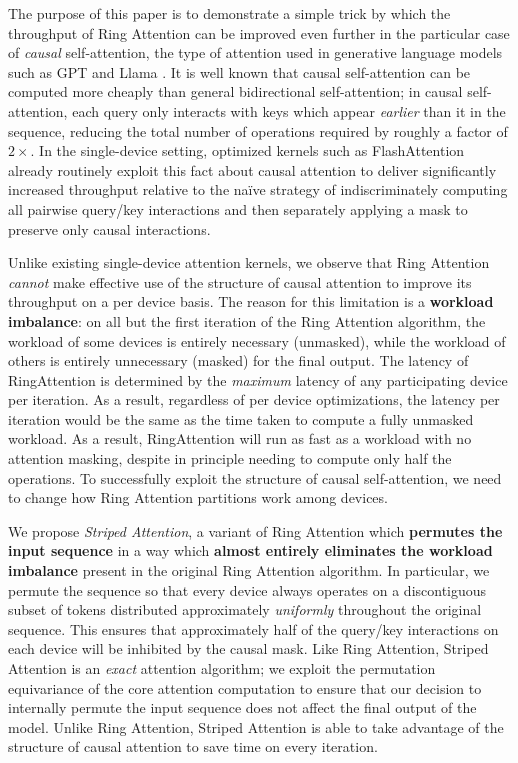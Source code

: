 The purpose of this paper is to demonstrate a simple trick by which the throughput of Ring Attention can be improved even further in the particular case of \emph{causal} self-attention, the type of attention used in generative language models such as GPT \cite{radford2018improving,radford2019language,gpt3} and Llama \cite{touvron2023llama,touvron2023llama2}. It is well known that causal self-attention can be computed more cheaply than general bidirectional self-attention; in causal self-attention, each query only interacts with keys which appear \emph{earlier} than it in the sequence, reducing the total number of operations required by roughly a factor of $2\times$. In the single-device setting, optimized kernels such as FlashAttention \cite{flash_attention,dao2023flashattention} already routinely exploit this fact about causal attention to deliver significantly increased throughput relative to the na\"ive strategy of indiscriminately computing all pairwise query/key interactions and then separately applying a mask to preserve only causal interactions.

Unlike existing single-device attention kernels, we observe that Ring Attention \emph{cannot} make effective use of the structure of causal attention to improve its throughput on a per device basis. The reason for this limitation is a \textbf{workload imbalance}: on all but the first iteration of the Ring Attention algorithm, the workload of some devices is entirely necessary (unmasked), while the workload of others is entirely unnecessary (masked) for the final output. The latency of RingAttention is determined by the \emph{maximum} latency of any participating device per iteration. As a result, regardless of per device optimizations, the latency per iteration would be the same as the time taken to compute a fully unmasked workload. As a result, RingAttention will run as fast as a workload with no attention masking, despite in principle needing to compute only half the operations. To successfully exploit the structure of causal self-attention, we need to change how Ring Attention partitions work among devices.

We propose \emph{Striped Attention}, a variant of Ring Attention which \textbf{permutes the input sequence} in a way which \textbf{almost entirely eliminates the workload imbalance} present in the original Ring Attention algorithm. In particular, we permute the sequence so that every device always operates on a discontiguous subset of tokens distributed approximately \emph{uniformly} throughout the original sequence. This ensures that approximately half of the query/key interactions on each device will be inhibited by the causal mask. Like Ring Attention, Striped Attention is an \emph{exact} attention algorithm; we exploit the permutation equivariance of the core attention computation to ensure that our decision to internally permute the input sequence does not affect the final output of the model. Unlike Ring Attention, Striped Attention is able to take advantage of the structure of causal attention to save time on every iteration.

